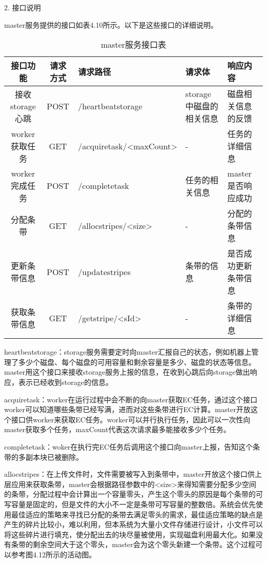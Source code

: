 2. 接口说明

master服务提供的接口如表4.10所示。以下是这些接口的详细说明。

\begin{table}[h]
  \centering
  \caption{master服务接口表}
  \begin{tabular}{ccp{2.5cm}p{2cm}p{3cm}}
    \toprule
    接口功能   & 请求方式    & 请求路径     & 请求体    & 响应内容                     \\
    \midrule
    接收storage心跳       & POST  & /heartbeatstorage                & storage中磁盘的相关信息   & 磁盘相关信息的反馈\\
    worker获取任务        & GET   & /acquiretask\newline/<maxCount>  & -                        & 任务的详细信息\\
    worker完成任务        & POST  & /completetask                    & 任务的相关信息            & master是否响应成功\\
    分配条带              & GET   & /allocstripes\newline/<size>     & -                        & 分配的条带信息\\
    更新条带信息          & POST  & /updatestripes                   & 条带的信息                & 是否成功更新条带信息\\
    获取条带信息          & GET   & /getstripe\newline/<sId>    & -                        & 条带的详细信息\\
    \bottomrule
  \end{tabular}
\end{table}	

heartbeatstorage：storage服务需要定时向master汇报自己的状态，例如机器上管理了多少个磁盘、每个磁盘的可用容量和剩余容量是多少、磁盘的状态等信息。master用这个接口来接收storage服务上报的信息，在收到心跳后向storage做出响应，表示已经收到storage的信息。

acquiretask：worker在运行过程中会不断的向master获取EC任务，通过这个接口worker可以知道哪些条带已经写满，进而对这些条带进行EC计算。master开放这个接口供worker来获取EC任务。worker可以并行执行任务，因此可以一次性向master获取多个任务，maxCount代表这次请求最多能接收多少个任务。

completetask：woker在执行完EC任务后调用这个接口向master上报，告知这个条带的多副本块已被删除。

allocstripes：在上传文件时，文件需要被写入到条带中，master开放这个接口供上层应用来获取条带，master会根据路径参数中的<size>来得知需要分配多少空间的条带，分配过程中会计算出一个容量零头，产生这个零头的原因是每个条带的可写容量是固定的，但是文件的大小不一定是条带可写容量的整数倍。系统会优先使用最佳适应的策略来寻找已分配的条带去满足零头的需求，最佳适应策略的缺点是产生的碎片比较小，难以利用，但本系统为大量小文件存储进行设计，小文件可以将这些碎片进行填充，使分配出去的块尽量被使用，实现磁盘利用最大化。如果没有条带的剩余空间大于这个零头，master会为这个零头新建一个条带。这个过程可以参考图4.12所示的活动图。

